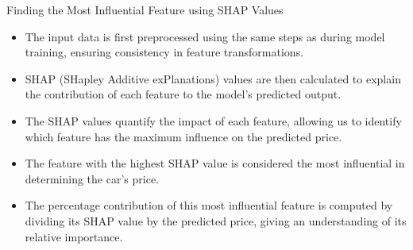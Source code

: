 \documentclass{beamer}
\begin{document}
\begin{frame}{Finding the Most Influential Feature using SHAP Values}
    \begin{itemize}
        \item The input data is first preprocessed using the same steps as during model training, ensuring consistency in feature transformations.
        \item SHAP (SHapley Additive exPlanations) values are then calculated to explain the contribution of each feature to the model’s predicted output.
        \item The SHAP values quantify the impact of each feature, allowing us to identify which feature has the maximum influence on the predicted price.
        \item The feature with the highest SHAP value is considered the most influential in determining the car's price.
        \item The percentage contribution of this most influential feature is computed by dividing its SHAP value by the predicted price, giving an understanding of its relative importance.
    \end{itemize}
\end{frame}
\end{document}
